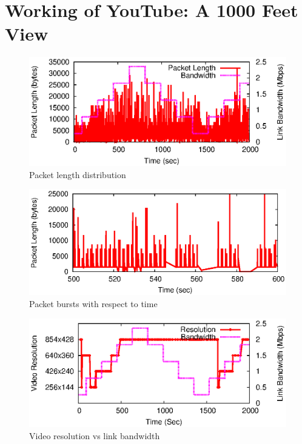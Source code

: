 \section{Working of YouTube: A 1000 Feet View}
\label{sec:overview}

\begin{figure}[!t]
	\centering
	\includegraphics[scale=0.85]{img/burst.eps}
	\caption{Packet length distribution}
	\label{fig:packet}
\end{figure}

\begin{figure}[!t]
	\centering
	\includegraphics[scale=0.85]{img/burst_scale.eps}
	\caption{Packet bursts with respect to time}
	\label{fig:burst}
\end{figure}

\begin{figure}[!t]
	\centering
	\includegraphics[scale=0.85]{img/bw_reso.eps}
	\caption{Video resolution vs link bandwidth}
	\label{fig:reso}
\end{figure}



